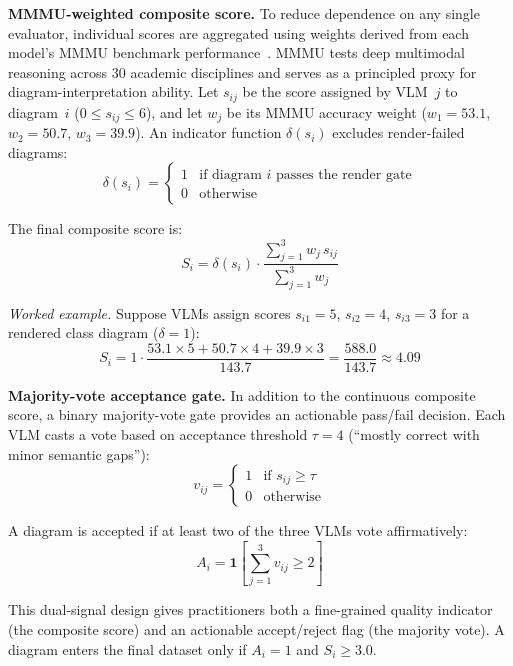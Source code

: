 \documentclass[conference]{IEEEtran}
\begin{document}
\textbf{MMMU-weighted composite score.}
To reduce dependence on any single evaluator, individual scores are
aggregated using weights derived from each model's MMMU benchmark
performance~\cite{yue2024mmmu}. MMMU tests deep multimodal reasoning
across 30 academic disciplines and serves as a principled proxy for
diagram-interpretation ability. Let $s_{ij}$ be the score assigned
by VLM~$j$ to diagram~$i$ ($0 \le s_{ij} \le 6$), and let $w_j$ be
its MMMU accuracy weight ($w_1 = 53.1$, $w_2 = 50.7$, $w_3 = 39.9$).
An indicator function $\delta(s_i)$ excludes render-failed diagrams:
\begin{equation}
  \delta(s_i) =
  \begin{cases}
    1 & \text{if diagram } i \text{ passes the render gate} \\
    0 & \text{otherwise}
  \end{cases}
  \label{eq:delta}
\end{equation}

The final composite score is:
\begin{equation}
  S_i = \delta(s_i)\cdot
  \frac{\displaystyle\sum_{j=1}^{3} w_j\, s_{ij}}
       {\displaystyle\sum_{j=1}^{3} w_j}
  \label{eq:weighted}
\end{equation}

\textit{Worked example.} Suppose VLMs assign scores $s_{i1}=5$,
$s_{i2}=4$, $s_{i3}=3$ for a rendered class diagram ($\delta=1$):
\[
  S_i = 1\cdot\frac{53.1\times5+50.7\times4+39.9\times3}{143.7}
      = \frac{588.0}{143.7} \approx 4.09
\]

\textbf{Majority-vote acceptance gate.}
In addition to the continuous composite score, a binary majority-vote
gate provides an actionable pass/fail decision. Each VLM casts a vote
based on acceptance threshold $\tau=4$ (``mostly correct with minor
semantic gaps''):
\begin{equation}
  v_{ij} =
  \begin{cases} 1 & \text{if } s_{ij} \ge \tau \\ 0 & \text{otherwise}
  \end{cases}
  \label{eq:vote}
\end{equation}

A diagram is accepted if at least two of the three VLMs vote
affirmatively:
\begin{equation}
  A_i = \mathbf{1}\!\left[\sum_{j=1}^{3} v_{ij} \ge 2\right]
  \label{eq:majority}
\end{equation}

This dual-signal design gives practitioners both a fine-grained
quality indicator (the composite score) and an actionable accept/reject
flag (the majority vote). A diagram enters the final dataset only if
$A_i = 1$ and $S_i \ge 3.0$.
\end{document}
